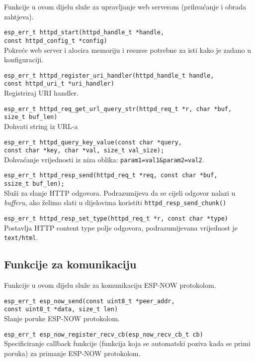 \documentclass[seminarskirad]{fer}
\begin{document}
Funkcije u ovom dijelu služe za upravljanje web serverom (prihvaćanje i obrada zahtjeva).

\verb|esp_err_t httpd_start(httpd_handle_t *handle, |\\
\verb|const httpd_config_t *config)| \\
Pokreće web server i alocira memoriju i resurse potrebne za isti kako je zadano u konfiguraciji.

\verb|esp_err_t httpd_register_uri_handler(httpd_handle_t handle, | \\
\verb|const httpd_uri_t *uri_handler)| \\
Registriraj URI handler.

\verb|esp_err_t httpd_req_get_url_query_str(httpd_req_t *r, char *buf, | \\
\verb|size_t buf_len)| \\
Dohvati string iz URL-a

\verb|esp_err_t httpd_query_key_value(const char *query, | \\
\verb|const char *key, char *val, size_t val_size);| \\
Dohvaćanje vrijednosti iz niza oblika: \verb|param1=val1&param2=val2|.

\verb|esp_err_t httpd_resp_send(httpd_req_t *req, const char *buf, | \\
\verb|ssize_t buf_len);| \\
Služi za slanje HTTP odgovora. Podrazumijeva da se cijeli odgovor nalazi u \textit{bufferu}, ako želimo slati u dijelovima koristiti \verb|httpd_resp_send_chunk()|

\verb|esp_err_t httpd_resp_set_type(httpd_req_t *r, const char *type)| \\
Postavlja HTTP content type polje odgovora, podrazumijevana vrijednost je \verb|text/html|.

\subsection{Funkcije za komunikaciju}

Funkcije u ovom dijelu služe za komunikaciju ESP-NOW protokolom.

\verb|esp_err_t esp_now_send(const uint8_t *peer_addr, | \\
\verb|const uint8_t *data, size_t len)| \\
Slanje poruke ESP-NOW protokolom.

\verb|esp_err_t esp_now_register_recv_cb(esp_now_recv_cb_t cb)| \\
Specificiranje callback funkcije (funkcija koja se automatski poziva kada se primi poruka) za primanje ESP-NOW protokolom.
\end{document}
